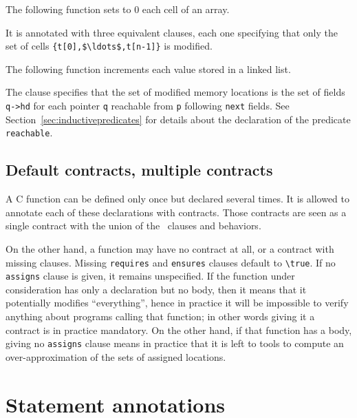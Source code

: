 \begin{example}
  The following function sets to 0 each cell of an array.

%
  It is annotated with three equivalent \assigns{} clauses, each one
  specifying that only the set of cells
  \lstinline|{t[0],$\ldots$,t[n-1]}|
  is modified.
\end{example}

\begin{example}
  \label{ex:locations-list}
  The following function increments each value stored in a linked
  list.

%
  The \assigns{} clause specifies that the set of modified memory
  locations is the set of fields \lstinline|q->hd| for each pointer
  \lstinline|q|
  reachable from \lstinline|p| following \lstinline|next| fields. See
  Section~\ref{sec:inductivepredicates} for details about the
  declaration of the predicate \texttt{reachable}.
\end{example}

\subsection{Default contracts, multiple contracts}
\label{sec:multiplecontracts}

A C function can be defined only once but declared several times.
It is allowed to annotate each of these declarations with contracts.
Those contracts are seen as a single contract with the union of the
\requires\ clauses and behaviors.

On the other hand, a function may have no contract at all, or a
contract with missing clauses. Missing \lstinline|requires| and
\lstinline|ensures| clauses default to \lstinline!\true!.
If no \lstinline|assigns| clause is given, it remains unspecified. If the
function under consideration has only a declaration but no body, then
it means that it potentially modifies ``everything'', hence in practice
it will be impossible to verify anything about programs calling that
function; in other words giving it a contract is in practice
mandatory. On the other hand, if that function has a body, giving no
\lstinline|assigns| clause means in practice that it is left to tools to
compute an over-approximation of the sets of assigned locations.

\section{Statement annotations}

